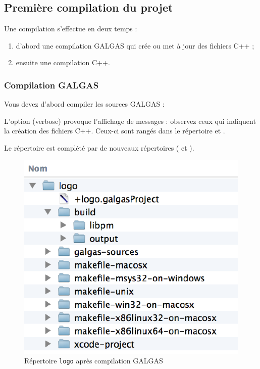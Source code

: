 \subsection{Première compilation du projet}

Une compilation s'effectue en deux temps :
\begin{enumerate}
  \item d'abord une compilation GALGAS qui crée ou met à jour des fichiers C++ ;
  \item ensuite une compilation C++.
\end{enumerate}


\subsubsection{Compilation GALGAS}

Vous devez d'abord compiler les sources GALGAS :
\begin{description}
  \item[ ] 
\end{description}

L'option  (verbose) provoque l'affichage de messages : observez ceux qui indiquent la création des fichiers C++. Ceux-ci sont rangés dans le répertoire  et .

Le répertoire  est complété par de nouveaux répertoires ( et ).
\begin{figure}[t]
  \centering
  \includegraphics{partie-utilisation/repertoire-logo.pdf}
  \caption{Répertoire \texttt{logo} après compilation GALGAS}
  \ligne
\end{figure}


